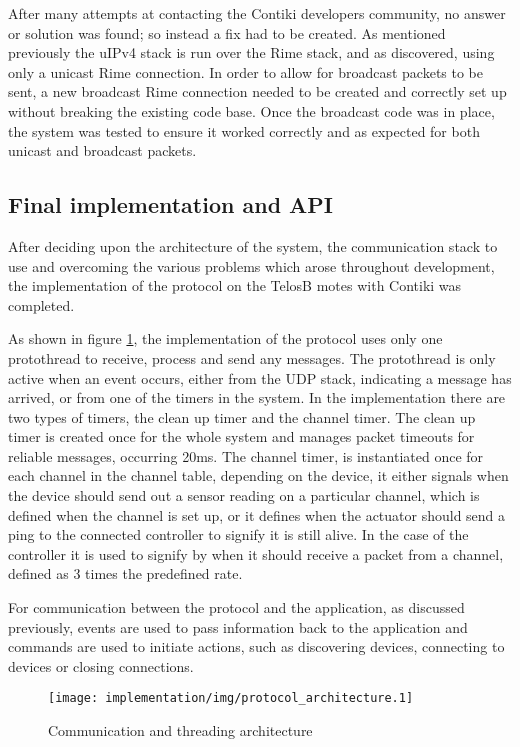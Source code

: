 After many attempts at contacting the Contiki developers community, no answer or solution was found; so instead a fix had to be created. As mentioned previously the uIPv4 stack is run over the Rime stack, and as discovered, using only a unicast Rime connection. In order to allow for broadcast packets to be sent, a new broadcast Rime connection needed to be created and correctly set up without breaking the existing code base. Once the broadcast code was in place, the system was tested to ensure it worked correctly and as expected for both unicast and broadcast packets.


\subsection{Final implementation and API}
After deciding upon the architecture of the system, the communication stack to use and overcoming the various problems which arose throughout development, the implementation of the protocol on the TelosB motes with Contiki was completed. 

As shown in figure \ref{fig:protocol_architecture}, the implementation of the protocol uses only one protothread to receive, process and send any messages. The protothread is only active when an event occurs, either from the UDP stack, indicating a message has arrived, or from one of the timers in the system. In the implementation there are two types of timers, the clean up timer and the channel timer. The clean up timer is created once for the whole system and manages packet timeouts for reliable messages, occurring 20ms. The channel timer, is instantiated once for each channel in the channel table, depending on the device, it either signals when the device should send out a sensor reading on a particular channel, which is defined when the channel is set up, or it defines when the actuator should send a ping to the connected controller to signify it is still alive. In the case of the controller it is used to signify by when it should receive a packet from a channel, defined as 3 times the predefined rate.

For communication between the protocol and the application, as discussed previously, events are used to pass information back to the application and commands are used to initiate actions, such as discovering devices, connecting to devices or closing connections.

\begin{figure}[h!]
\centering
\texttt{[image: implementation/img/protocol\_architecture.1]}
\caption{Communication and threading architecture}
\label{fig:protocol_architecture}
\end{figure}

